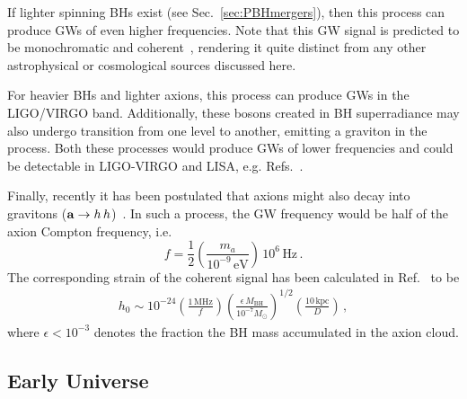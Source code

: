 \documentclass[11pt,a4paper]{article}
\begin{document}
If lighter spinning BHs exist (see Sec.~\ref{sec:PBHmergers}), then this process can produce GWs of even higher frequencies.  Note that this GW signal is predicted to be monochromatic and coherent~\cite{Arvanitaki:2014wva}, rendering it quite distinct from any other astrophysical or cosmological sources discussed here.

For heavier BHs and lighter axions, this process can produce GWs in the LIGO/VIRGO band. Additionally, these bosons created in BH superradiance may also undergo transition from one level to another, emitting a graviton in the process. Both these processes would  produce GWs of lower frequencies and could be detectable in LIGO-VIRGO and LISA, e.g. Refs.~\cite{Brito+2017,Zhu:2020tht,Tsukada:2018mbp}.

Finally, recently it has been postulated that axions might also decay into gravitons (${\bf a}\to h \, h$)~\cite{Sun:2020gem}. In such a process, the GW frequency would be half of the axion Compton frequency, i.e.
\begin{equation}
\label{eq:fsprdecay}
f = \frac{1}{2}\left( \frac{m_a}{10^{-9} \, \text{eV}} \right) \, 10^{6} \, \text{Hz} \,.
\end{equation}
The corresponding strain of the coherent signal has been calculated in Ref.~\cite{Sun:2020gem} to be
\begin{align}\label{GWhg1}
  h_0  \sim 10^{-24} \left(\frac{1 \, \text{MHz}}{f}\right)  \left(\frac{\epsilon \, M_\text{BH}}{ 10^{-7} M_{\odot}} \right)^{1/2} \left(\frac{10 \, \text{kpc}}{D}\right) \,,
     \end{align}
where $\epsilon < 10^{-3}$ denotes the fraction the BH mass accumulated in the axion cloud.

\subsection{Early Universe \label{sec:earlyU} }
\end{document}
